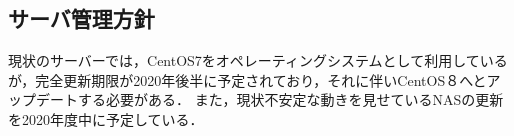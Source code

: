 \subsection*{サーバ管理方針}

現状のサーバーでは，CentOS7をオペレーティングシステムとして利用しているが，完全更新期限が2020年後半に予定されており，それに伴いCentOS８へとアップデートする必要がある．
また，現状不安定な動きを見せているNASの更新を2020年度中に予定している．